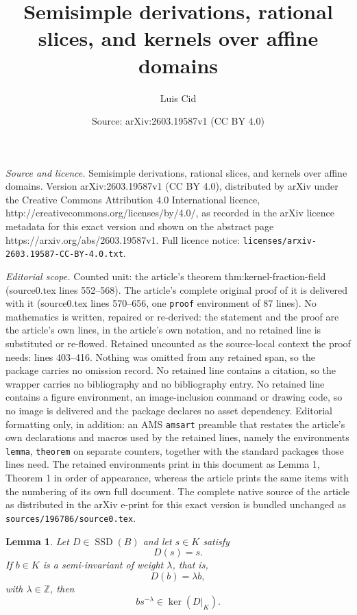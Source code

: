 \documentclass[10pt,a4paper]{amsart}
\title{Semisimple derivations, rational slices, and kernels over affine domains}
\author{Luis Cid}
\date{Source: arXiv:2603.19587v1 (CC BY 4.0)}
\newtheorem{lemma}{Lemma}
\newcommand{\SSD}{\operatorname{SSD}}
\newcommand{\Z}{\mathbb Z}
\begin{document}
\maketitle

\noindent\emph{Source and licence.} Semisimple derivations, rational slices, and kernels over affine domains. Version arXiv:2603.19587v1 (CC BY 4.0), distributed by arXiv under the Creative Commons Attribution 4.0 International licence, http://creativecommons.org/licenses/by/4.0/, as recorded in the arXiv licence metadata for this exact version and shown on the abstract page https://arxiv.org/abs/2603.19587v1. Full licence notice: \texttt{licenses/arxiv-2603.19587-CC-BY-4.0.txt}.\par\smallskip

\noindent\textit{Editorial scope.} Counted unit: the article's theorem thm:kernel-fraction-field (source0.tex lines 552--568). The article's complete original proof of it is delivered with it (source0.tex lines 570--656, one \texttt{proof} environment of 87 lines). No mathematics is written, repaired or re-derived: the statement and the proof are the article's own lines, in the article's own notation, and no retained line is substituted or re-flowed.  Retained uncounted as the source-local context the proof needs: lines 403--416.  Nothing was omitted from any retained span, so the package carries no omission record.  No retained line contains a citation, so the wrapper carries no bibliography and no bibliography entry.  No retained line contains a figure environment, an image-inclusion command or drawing code, so no image is delivered and the package declares no asset dependency.  Editorial formatting only, in addition: an AMS \texttt{amsart} preamble that restates the article's own declarations and macros used by the retained lines, namely the environments \texttt{lemma}, \texttt{theorem} on separate counters, together with the standard packages those lines need.  The retained environments print in this document as Lemma 1, Theorem 1 in order of appearance, whereas the article prints the same items with the numbering of its own full document.  The complete native source of the article as distributed in the arXiv e-print for this exact version is bundled unchanged as \texttt{sources/196786/source0.tex}.
\begin{lemma}\label{lem:kernel-weighted-element}
Let $D\in \SSD(B)$ and let $s\in K$ satisfy
\[
D(s)=s.
\]
If $b\in K$ is a semi-invariant of weight $\lambda$, that is,
\[
D(b)=\lambda b,
\]
with $\lambda\in \Z$, then
\[
bs^{-\lambda}\in \ker(D|_K).
\]
\end{lemma}
\end{document}
